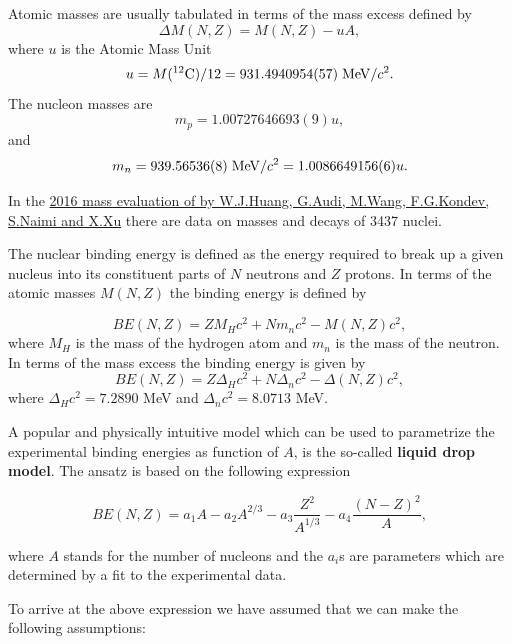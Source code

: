 \documentclass[%
oneside,                 %
final,                   %
10pt]{article}
\begin{document}
Atomic masses are usually tabulated in terms of the mass excess defined by
\[
\Delta M(N, Z) =  M(N, Z) - uA,
\]
where $u$ is the Atomic Mass Unit 
\[
u = M(^{12}\mathrm{C})/12 = 931.4940954(57) \hspace{0.1cm} \mathrm{MeV}/c^2.
\]
The nucleon masses are
\[
m_p =  1.00727646693(9)u,
\] 
and
\[
m_n = 939.56536(8)\hspace{0.1cm} \mathrm{MeV}/c^2 = 1.0086649156(6)u.
\]

In the \href{{http://nuclearmasses.org/resources_folder/Wang_2017_Chinese_Phys_C_41_030003.pdf}}{2016 mass evaluation of by W.J.Huang, G.Audi, M.Wang, F.G.Kondev, S.Naimi and X.Xu}
there are data on masses and decays of 3437 nuclei.

The nuclear binding energy is defined as the energy required to break
up a given nucleus into its constituent parts of $N$ neutrons and $Z$
protons. In terms of the atomic masses $M(N, Z)$ the binding energy is
defined by


\[
BE(N, Z) = ZM_H c^2 + Nm_n c^2 - M(N, Z)c^2 ,
\]
where $M_H$ is the mass of the hydrogen atom and $m_n$ is the mass of the neutron.
In terms of the mass excess the binding energy is given by
\[
BE(N, Z) = Z\Delta_H c^2 + N\Delta_n c^2 -\Delta(N, Z)c^2 ,
\]
where $\Delta_H c^2 = 7.2890$ MeV and $\Delta_n c^2 = 8.0713$ MeV.


A popular and physically intuitive model which can be used to parametrize 
the experimental binding energies as function of $A$, is the so-called 
\textbf{liquid drop model}. The ansatz is based on the following expression

\[ 
BE(N,Z) = a_1A-a_2A^{2/3}-a_3\frac{Z^2}{A^{1/3}}-a_4\frac{(N-Z)^2}{A},
\]

where $A$ stands for the number of nucleons and the $a_i$s are parameters which are determined by a fit 
to the experimental data.  




To arrive at the above expression we have assumed that we can make the following assumptions:
\end{document}
